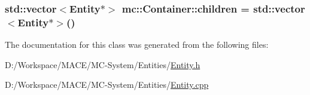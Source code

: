 \subsubsection[{\texorpdfstring{children}{children}}]{\setlength{\rightskip}{0pt plus 5cm}std\+::vector$<${\bf Entity}$\ast$$>$ mc\+::\+Container\+::children = std\+::vector$<${\bf Entity}$\ast$$>$()\hspace{0.3cm}{\ttfamily [protected]}}\hypertarget{classmc_1_1_container_a61ab3823bf33ae5f8f1bfdb79501b242}{}\label{classmc_1_1_container_a61ab3823bf33ae5f8f1bfdb79501b242}


The documentation for this class was generated from the following files\+:\begin{DoxyCompactItemize}
\item 
D\+:/\+Workspace/\+M\+A\+C\+E/\+M\+C-\/\+System/\+Entities/\hyperlink{_entity_8h}{Entity.\+h}\item 
D\+:/\+Workspace/\+M\+A\+C\+E/\+M\+C-\/\+System/\+Entities/\hyperlink{_entity_8cpp}{Entity.\+cpp}\end{DoxyCompactItemize}
